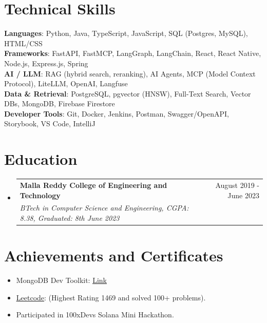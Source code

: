 \documentclass[letterpaper,11pt]{article}
\makeatletter
\newcommand{\resumeItem}[1]{\item\small{{#1 \vspace{-2pt}}}}
\newcommand{\resumeSubheading}[4]{
  \vspace{-2pt}\item
    \begin{tabular*}{0.97\textwidth}[t]{l@{\extracolsep{\fill}}r}
      \textbf{#1} & #2 \\
      \textit{\small#3} & \textit{\small #4} \\
    \end{tabular*}\vspace{-7pt}
}
\newcommand{\resumeSubHeadingListStart}{\begin{itemize}[leftmargin=0.15in, label={}]}
\newcommand{\resumeSubHeadingListEnd}{\end{itemize}}
\makeatother
\begin{document}
\section{Technical Skills}
 \begin{itemize}[leftmargin=0.15in, label={}]
    \small{\item{
     \textbf{Languages}{: Python, Java, TypeScript, JavaScript, SQL (Postgres, MySQL), HTML/CSS} \\
     \textbf{Frameworks}{: FastAPI, FastMCP, LangGraph, LangChain, React, React Native, Node.js, Express.js, Spring} \\
     \textbf{AI / LLM}{: RAG (hybrid search, reranking), AI Agents, MCP (Model Context Protocol), LiteLLM, OpenAI, Langfuse} \\
     \textbf{Data \& Retrieval}{: PostgreSQL, pgvector (HNSW), Full-Text Search, Vector DBs, MongoDB, Firebase Firestore} \\
     \textbf{Developer Tools}{: Git, Docker, Jenkins, Postman, Swagger/OpenAPI, Storybook, VS Code, IntelliJ}
    }}
 \end{itemize}

\section{Education}
  \resumeSubHeadingListStart
    \resumeSubheading
      {Malla Reddy College of Engineering and Technology}{August 2019 - June 2023}
      {BTech in Computer Science and Engineering, CGPA: 8.38, Graduated: 8th June 2023}{}
  \resumeSubHeadingListEnd

\section{Achievements and Certificates}
  \begin{itemize}
    \resumeItem{MongoDB Dev Toolkit: \href{https://www.geeksforgeeks.org/certificate/649ea5117dbae94e35b1ed66bb1de99d}{\underline{Link}}}
    \resumeItem{\href{https://leetcode.com/Tiwari_ji07/}{\underline{Leetcode}}: (Highest Rating 1469 and solved 100+ problems).}
    \resumeItem{Participated in 100xDevs Solana Mini Hackathon.}
  \end{itemize}
\end{document}
